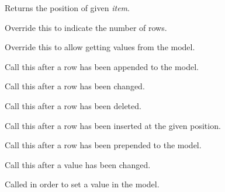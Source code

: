 Returns the position of given {\it item}.

\label{wxdataviewindexlistmodelgetrowcount}


Override this to indicate the number of rows.

\label{wxdataviewindexlistmodelgetvalue}


Override this to allow getting values from the model.

\label{wxdataviewindexlistmodelrowappended}


Call this after a row has been appended to the model.

\label{wxdataviewindexlistmodelrowchanged}


Call this after a row has been changed.

\label{wxdataviewindexlistmodelrowdeleted}


Call this after a row has been deleted.

\label{wxdataviewindexlistmodelrowinserted}


Call this after a row has been inserted at the given position.

\label{wxdataviewindexlistmodelrowprepended}


Call this after a row has been prepended to the model.

\label{wxdataviewindexlistmodelrowvaluechanged}


Call this after a value has been changed.

\label{wxdataviewindexlistmodelsetvalue}


Called in order to set a value in the model.
